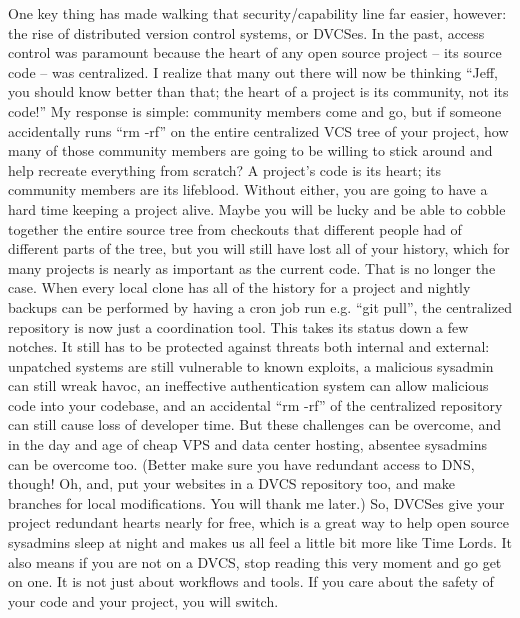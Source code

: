 One key thing has made walking that security/capability line far easier,
however: the rise of distributed version control systems, or DVCSes.
In the past, access control was paramount because the heart of any open source
project -- its source code -- was centralized. I realize that many out there
will now be thinking ``Jeff, you should know better than that; the heart of a
project is its community, not its code!'' My response is simple: community
members come and go, but if someone accidentally runs ``rm -rf'' on the entire
centralized VCS tree of your project, how many of those community members are
going to be willing to stick around and help recreate everything from scratch? A
project’s code is its heart; its community members are its lifeblood. Without
either, you are going to have a hard time keeping a project alive. Maybe you will
be lucky and be able to cobble together the entire source tree from checkouts
that different people had of different parts of the tree, but you will still have
lost all of your history, which for many projects is nearly as important as the
current code.
That is no longer the case. When every local clone has all of the history for a
project and nightly backups can be performed by having a cron job run e.g. ``git
pull'', the centralized repository is now just a coordination tool. This takes
its status down a few notches. It still has to be protected against threats both
internal and external: unpatched systems are still vulnerable to known exploits,
a malicious sysadmin can still wreak havoc, an ineffective authentication system
can allow malicious code into your codebase, and an accidental ``rm -rf'' of the
centralized repository can still cause loss of developer time. But these
challenges can be overcome, and in the day and age of cheap VPS and data center
hosting, absentee sysadmins can be overcome too. (Better make sure you have
redundant access to DNS, though! Oh, and, put your websites in a DVCS repository
too, and make branches for local modifications. You will thank me later.)
So, DVCSes give your project redundant hearts nearly for free, which is a great
way to help open source sysadmins sleep at night and makes us all feel a little
bit more like Time Lords. It also means if you are not on a DVCS, stop reading
this very moment and go get on one. It is not just about workflows and tools. If
you care about the safety of your code and your project, you will switch.

